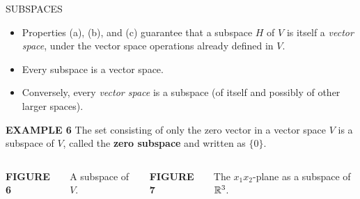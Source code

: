 \begin{frame}{SUBSPACES}
\begin{itemize}
\item Properties (a), (b), and (c) guarantee that a subspace $H$ of $V$ is itself a \emph{vector space}, under the vector space operations already defined in $V$.
\item Every subspace is a vector space.
\item Conversely, every \emph{vector space} is a subspace (of itself and possibly of other larger spaces).
\end{itemize}
\end{frame}

\begin{frame}[shrink=10]
\textcolor{red!70!black}{\textbf{EXAMPLE 6}}\quad
The set consisting of only the zero vector in a vector space $V$ is a subspace of $V$, called the \textbf{zero subspace} and written as $\{0\}$.
\vspace{0.5cm}
\begin{columns}[T]
\centering
{}

\textbf{FIGURE 6}\par A subspace of $V$.
\centering
{}

\textbf{FIGURE 7}\par The $x_1x_2$-plane as a subspace of $\mathbb{R}^3$.
\end{columns}
\end{frame}

